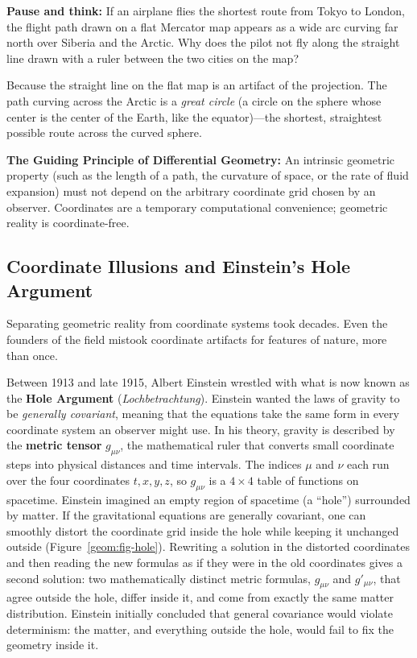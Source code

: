 \begin{walkbox}
\textbf{Pause and think:} If an airplane flies the shortest route from Tokyo to London, the flight path drawn on a flat Mercator map appears as a wide arc curving far north over Siberia and the Arctic. Why does the pilot not fly along the straight line drawn with a ruler between the two cities on the map?

Because the straight line on the flat map is an artifact of the projection. The path curving across the Arctic is a \emph{great circle} (a circle on the sphere whose center is the center of the Earth, like the equator)---the shortest, straightest possible route across the curved sphere.
\end{walkbox}

\begin{intuitionbox}
\textbf{The Guiding Principle of Differential Geometry:}
An intrinsic geometric property (such as the length of a path, the curvature of space, or the rate of fluid expansion) must not depend on the arbitrary coordinate grid chosen by an observer. Coordinates are a temporary computational convenience; geometric reality is coordinate-free.
\end{intuitionbox}

\subsection{Coordinate Illusions and Einstein's Hole Argument}

Separating geometric reality from coordinate systems took decades. Even the founders of the field mistook coordinate artifacts for features of nature, more than once.

Between 1913 and late 1915, Albert Einstein wrestled with what is now known as the \textbf{Hole Argument} (\emph{Lochbetrachtung}). Einstein wanted the laws of gravity to be \emph{generally covariant}, meaning that the equations take the same form in every coordinate system an observer might use. In his theory, gravity is described by the \textbf{metric tensor} $g_{\mu\nu}$, the mathematical ruler that converts small coordinate steps into physical distances and time intervals. The indices $\mu$ and $\nu$ each run over the four coordinates $t, x, y, z$, so $g_{\mu\nu}$ is a $4 \times 4$ table of functions on spacetime. Einstein imagined an empty region of spacetime (a ``hole'') surrounded by matter. If the gravitational equations are generally covariant, one can smoothly distort the coordinate grid inside the hole while keeping it unchanged outside (Figure~\ref{geom:fig-hole}). Rewriting a solution in the distorted coordinates and then reading the new formulas as if they were in the old coordinates gives a second solution: two mathematically distinct metric formulas, $g_{\mu\nu}$ and $g'_{\mu\nu}$, that agree outside the hole, differ inside it, and come from exactly the same matter distribution. Einstein initially concluded that general covariance would violate determinism: the matter, and everything outside the hole, would fail to fix the geometry inside it.

